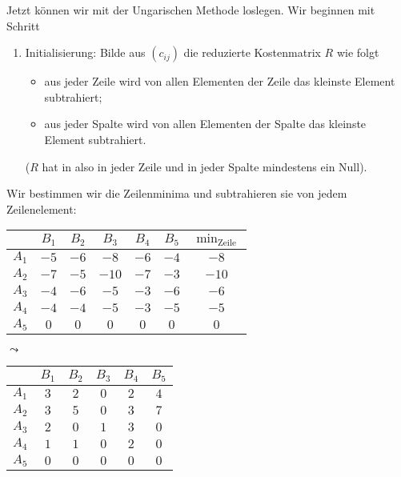 \documentclass[
a4paper, %
11pt,
]
{scrartcl}
\begin{document}
Jetzt können wir mit der Ungarischen Methode loslegen. Wir beginnen mit Schritt
\begin{enumerate}[(1)]
  \item Initialisierung: Bilde aus $(c_{ij})$ die reduzierte Kostenmatrix $R$
    wie folgt
    \begin{itemize}
      \item aus jeder Zeile wird von allen Elementen der Zeile das kleinste
        Element subtrahiert;
      \item aus jeder Spalte wird von allen Elementen der Spalte das kleinste
        Element subtrahiert.
    \end{itemize}
    ($R$ hat in also in jeder Zeile und in jeder Spalte mindestens ein Null).
\end{enumerate}

Wir bestimmen wir die Zeilenminima und subtrahieren sie von jedem Zeilenelement:

\begin{center}
  \begin{tabular}{c|ccccc|c}
             & $B_1$ & $B_2$ & $B_3$ & $B_4$ & $B_5$ & $\min_{\text{Zeile}}$\\
    \midrule
    $A_1$    & $-5$  & $-6$  & $-8$  & $-6$  & $-4$  & $-8$\\
    $A_2$    & $-7$  & $-5$  & $-10$ & $-7$  & $-3$  & $-10$\\
    $A_3$    & $-4$  & $-6$  & $-5$  & $-3$  & $-6$  & $-6$\\
    $A_4$    & $-4$  & $-4$  & $-5$  & $-3$  & $-5$  & $-5$\\
    $A_5$    & $0$   & $0$   & $0$   & $0$   & $0$   & $0$\\
  \end{tabular}
  \qquad $\leadsto$ \qquad
  \begin{tabular}{c|ccccc}
              & $B_1$ & $B_2$ & $B_3$ & $B_4$ & $B_5$\\
    \midrule
    $A_1$     & $3$   & $2$   & $0$   & $2$   & $4$\\
    $A_2$     & $3$   & $5$   & $0$   & $3$   & $7$\\
    $A_3$     & $2$   & $0$   & $1$   & $3$   & $0$\\
    $A_4$     & $1$   & $1$   & $0$   & $2$   & $0$\\
    $A_5$     & $0$   & $0$   & $0$   & $0$   & $0$\\
  \end{tabular}
\end{center}
\end{document}
